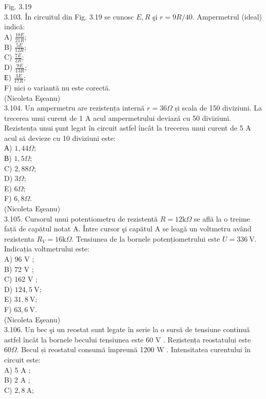 \documentclass[10pt]{article}
\begin{document}
Fig. 3.19\\
3.103. În circuitul din Fig. 3.19 se cunosc $E, R$ şi $r=9 R / 40$. Ampermetrul (ideal) indică:\\
A) $\frac{10 E}{21 R}$;\\
B) $\frac{5 E}{12 R}$;\\
C) $\frac{7 E}{2 R}$;\\
D) $\frac{9 E}{13 R}$;\\
Е) $\frac{3 E}{17 R}$;\\
F) nici o variantă nu este corectă.\\
(Nicoleta Eşeanu)\\
3.104. Un ampermetru are rezistența internă $r=36 \Omega$ și scala de 150 diviziuni. La trecerea unui curent de 1 A acul ampermetrului deviază cu 50 diviziuni. Rezistența unui şunt legat în circuit astfel încât la trecerea unui curent de 5 A acul să devieze cu 10 diviziuni este:\\
А) $1,44 \Omega$;\\
В) $1,5 \Omega$;\\
C) $2,88 \Omega$;\\
D) $3 \Omega$;\\
E) $6 \Omega$;\\
F) $6,8 \Omega$.\\
(Nicoleta Eşeanu)\\
3.105. Cursorul unui potentiometru de rezistentă $R=12 \mathrm{k} \Omega$ se află la o treime față de capătul notat A. Între cursor şi capătul A se leagă un voltmetru având rezistenta $R_{V}=16 \mathrm{k} \Omega$. Tensiunea de la bornele potențiometrului este $U=336 \mathrm{~V}$. Indicația voltmetrului este:\\
A) 96 V ;\\
B) 72 V ;\\
C) 162 V ;\\
D) $124,5 \mathrm{~V}$;\\
E) $31,8 \mathrm{~V}$;\\
F) $63,6 \mathrm{~V}$.\\
(Nicoleta Eşeanu)\\
3.106. Un bec şi un reostat sunt legate în serie la o sursă de tensiune continuă astfel încât la bornele becului tensiunea este 60 V . Rezistența reostatului este $60 \Omega$. Becul și reostatul consumă împreună 1200 W . Intensitatea curentului în circuit este:\\
A) 5 A ;\\
B) 2 A ;\\
C) $2,8 \mathrm{~A}$;\\
\end{document}
